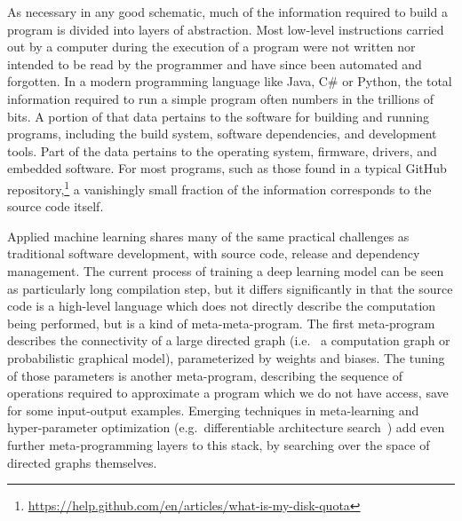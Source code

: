 \documentclass[12pt,initial,twoside,maitrise]{dms}
\numberwithin{equation}{section}
\numberwithin{table}{chapter}
\numberwithin{figure}{chapter}
\begin{document}
As necessary in any good schematic, much of the information required to build a program is divided into layers of abstraction. Most low-level instructions carried out by a computer during the execution of a program were not written nor intended to be read by the programmer and have since been automated and forgotten. In a modern programming language like Java, C\# or Python, the total information required to run a simple program often numbers in the trillions of bits. A portion of that data pertains to the software for building and running programs, including the build system, software dependencies, and development tools. Part of the data pertains to the operating system, firmware, drivers, and embedded software. For most programs, such as those found in a typical GitHub repository,\hspace{-.08em}\footnote{\url{https://help.github.com/en/articles/what-is-my-disk-quota}} a vanishingly small fraction of the information corresponds to the source code itself.

Applied machine learning shares many of the same practical challenges as traditional software development, with source code, release and dependency management. The current process of training a deep learning model can be seen as particularly long compilation step, but it differs significantly in that the source code is a high-level language which does not directly describe the computation being performed, but is a kind of meta-meta-program. The first meta-program describes the connectivity of a large directed graph (i.e.~ a computation graph or probabilistic graphical model), parameterized by weights and biases. The tuning of those parameters is another meta-program, describing the sequence of operations required to approximate a program which we do not have access, save for some input-output examples. Emerging techniques in meta-learning and hyper-parameter optimization (e.g.~differentiable architecture search~\citep{liu2018darts}) add even further meta-programming layers to this stack, by searching over the space of directed graphs themselves.
\end{document}
